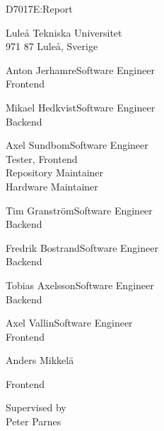 \begin{center}
    {\LARGE D7017E:\@ Report}\par
    \vspace{\baselineskip}

    {\Large Luleå Tekniska Universitet}\\{\large 971 87 Luleå, Sverige}\par
\end{center}

\vfill

            {Anton Jerhamre}{Software Engineer \\ Frontend}

            {Mikael Hedkvist}{Software Engineer \\ Backend}

            {Axel Sundbom}{Software Engineer \\ Tester, Frontend \\ Repository Maintainer \\ Hardware Maintainer}

            {Tim Granström}{Software Engineer\\ Backend}

            {Fredrik Bostrand}{Software Engineer \\ Backend}

            {Tobias Axelsson}{Software Engineer \\ Backend}

            {Axel Vallin}{Software Engineer \\ Frontend}


\begin{center}
    \begin{member}
    \centering
    Anders Mikkelä\par
    Frontend
    \end{member}
\end{center}

\vfill

\begin{center}
    Supervised by\\ Peter Parnes
\end{center}
